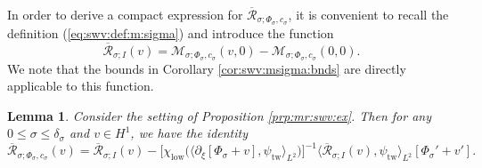 \documentclass[10pt]{articleHJ}
\newcommand{\sref}[1]{(\ref{#1})}                       %
\newtheorem{lem}[thm]{Lemma}
\numberwithin{equation}{section}
\begin{document}
In order to derive a compact expression
for $\overline{\mathcal{R}}_{\sigma;\Phi_{\sigma}, c_{\sigma}}$,
it is convenient to
recall the definition
\sref{eq:swv:def:m:sigma}
and
introduce the function
\begin{equation}
\overline{\mathcal{R}}_{\sigma;I}(v) =
\mathcal{M}_{\sigma;\Phi_{\sigma} , c_{\sigma} }
     (v, 0)
  - \mathcal{M}_{\sigma;\Phi_{\sigma} , c_{\sigma}}(0, 0).
\end{equation}
We note that the bounds in
Corollary \ref{cor:swv:msigma:bnds}
are directly applicable to this function.



\begin{lem}
Consider the setting
of Proposition \ref{prp:mr:swv:ex}.
Then for any $0 \le \sigma \le \delta_{\sigma}$
and $v \in H^1$,
we have the identity
\begin{equation}
\label{eq:fnl:id:for:r:sigma}
\overline{\mathcal{R}}_{\sigma;\Phi_{\sigma} , c_{\sigma}}(v)
= \overline{\mathcal{R}}_{\sigma;I}(v)
 - \Big[\chi_{\mathrm{low}}\big(\langle\partial_\xi[\Phi_{\sigma} + v ] ,
    \psi_{\mathrm{tw}} \rangle_{L^2} \big)\Big]^{-1}
   \langle
     \overline{\mathcal{R}}_{\sigma;I}(v),
     \psi_{\mathrm{tw}}
  \rangle_{L^2}
  [\Phi_{\sigma}' + v'].
\end{equation}
\end{lem}
\end{document}
